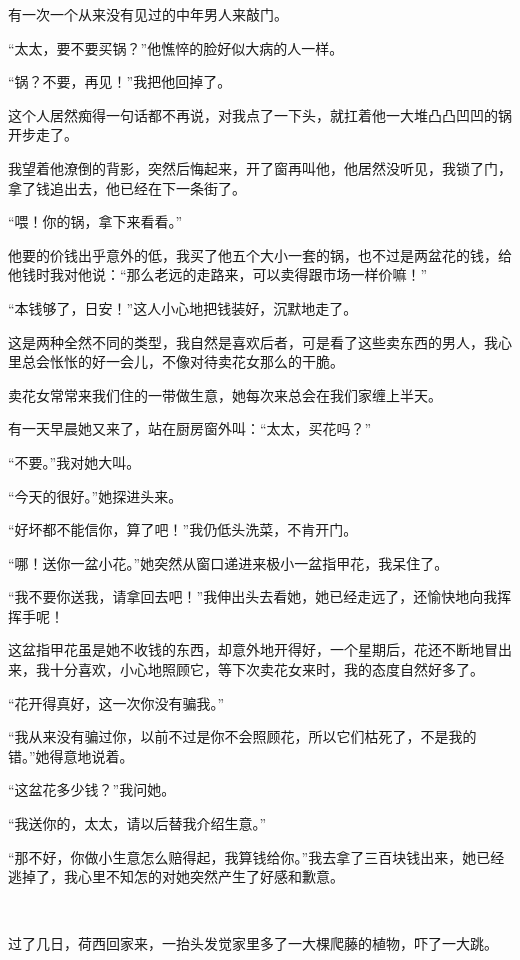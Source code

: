 \par 有一次一个从来没有见过的中年男人来敲门。
\par “太太，要不要买锅？”他憔悴的脸好似大病的人一样。
\par “锅？不要，再见！”我把他回掉了。
\par 这个人居然痴得一句话都不再说，对我点了一下头，就扛着他一大堆凸凸凹凹的锅开步走了。
\par 我望着他潦倒的背影，突然后悔起来，开了窗再叫他，他居然没听见，我锁了门，拿了钱追出去，他已经在下一条街了。
\par “喂！你的锅，拿下来看看。”
\par 他要的价钱出乎意外的低，我买了他五个大小一套的锅，也不过是两盆花的钱，给他钱时我对他说：“那么老远的走路来，可以卖得跟市场一样价嘛！”
\par “本钱够了，日安！”这人小心地把钱装好，沉默地走了。
\par 这是两种全然不同的类型，我自然是喜欢后者，可是看了这些卖东西的男人，我心里总会怅怅的好一会儿，不像对待卖花女那么的干脆。
\par 卖花女常常来我们住的一带做生意，她每次来总会在我们家缠上半天。
\par 有一天早晨她又来了，站在厨房窗外叫：“太太，买花吗？”
\par “不要。”我对她大叫。
\par “今天的很好。”她探进头来。
\par “好坏都不能信你，算了吧！”我仍低头洗菜，不肯开门。
\par “哪！送你一盆小花。”她突然从窗口递进来极小一盆指甲花，我呆住了。
\par “我不要你送我，请拿回去吧！”我伸出头去看她，她已经走远了，还愉快地向我挥挥手呢！
\par 这盆指甲花虽是她不收钱的东西，却意外地开得好，一个星期后，花还不断地冒出来，我十分喜欢，小心地照顾它，等下次卖花女来时，我的态度自然好多了。
\par “花开得真好，这一次你没有骗我。”
\par “我从来没有骗过你，以前不过是你不会照顾花，所以它们枯死了，不是我的错。”她得意地说着。
\par “这盆花多少钱？”我问她。
\par “我送你的，太太，请以后替我介绍生意。”
\par “那不好，你做小生意怎么赔得起，我算钱给你。”我去拿了三百块钱出来，她已经逃掉了，我心里不知怎的对她突然产生了好感和歉意。
\par  
\par 过了几日，荷西回家来，一抬头发觉家里多了一大棵爬藤的植物，吓了一大跳。
